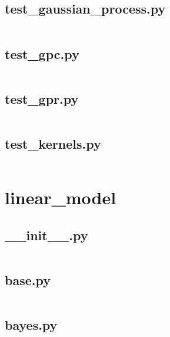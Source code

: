 \documentclass{article}
\begin{document}
\subsection{test\_gaussian\_process.py}
\inputminted{python}{/home/dufferzafar/dev/@clones/scikit-learn/sklearn/gaussian_process/tests/test_gaussian_process.py}
\newpage

\subsection{test\_gpc.py}
\inputminted{python}{/home/dufferzafar/dev/@clones/scikit-learn/sklearn/gaussian_process/tests/test_gpc.py}
\newpage

\subsection{test\_gpr.py}
\inputminted{python}{/home/dufferzafar/dev/@clones/scikit-learn/sklearn/gaussian_process/tests/test_gpr.py}
\newpage

\subsection{test\_kernels.py}
\inputminted{python}{/home/dufferzafar/dev/@clones/scikit-learn/sklearn/gaussian_process/tests/test_kernels.py}
\newpage

\section{linear\_model}

\subsection{\_\_init\_\_.py}
\inputminted{python}{/home/dufferzafar/dev/@clones/scikit-learn/sklearn/linear_model/__init__.py}
\newpage

\subsection{base.py}
\inputminted{python}{/home/dufferzafar/dev/@clones/scikit-learn/sklearn/linear_model/base.py}
\newpage

\subsection{bayes.py}
\inputminted{python}{/home/dufferzafar/dev/@clones/scikit-learn/sklearn/linear_model/bayes.py}
\newpage
\end{document}

